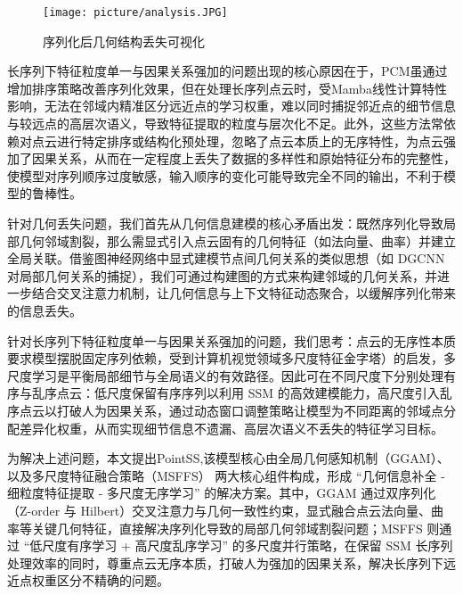\documentclass[preprint,12pt]{elsarticle}
\begin{document}
\begin{figure}[htbp]
	\centering
	\texttt{[image: picture/analysis.JPG]}
	\caption{序列化后几何结构丢失可视化}
	\label{fig:analysis}
\end{figure}

长序列下特征粒度单一与因果关系强加的问题出现的核心原因在于，PCM虽通过增加排序策略改善序列化效果，但在处理长序列点云时，受Mamba线性计算特性影响，无法在邻域内精准区分远近点的学习权重，难以同时捕捉邻近点的细节信息与较远点的高层次语义，导致特征提取的粒度与层次化不足。此外，这些方法常依赖对点云进行特定排序或结构化预处理，忽略了点云本质上的无序特性，为点云强加了因果关系，从而在一定程度上丢失了数据的多样性和原始特征分布的完整性，使模型对序列顺序过度敏感，输入顺序的变化可能导致完全不同的输出，不利于模型的鲁棒性。

针对几何丢失问题，我们首先从几何信息建模的核心矛盾出发：既然序列化导致局部几何邻域割裂，那么需显式引入点云固有的几何特征（如法向量、曲率）并建立全局关联。借鉴图神经网络中显式建模节点间几何关系的类似思想（如 DGCNN 对局部几何关系的捕捉\cite{DGCNN}），我们可通过构建图的方式来构建邻域的几何关系，并进一步结合交叉注意力机制，让几何信息与上下文特征动态聚合，以缓解序列化带来的信息丢失。

针对长序列下特征粒度单一与因果关系强加的问题，我们思考：点云的无序性本质要求模型摆脱固定序列依赖，受到计算机视觉领域多尺度特征金字塔\cite{fpn}）的启发，多尺度学习是平衡局部细节与全局语义的有效路径。因此可在不同尺度下分别处理有序与乱序点云：低尺度保留有序序列以利用 SSM 的高效建模能力，高尺度引入乱序点云以打破人为因果关系，通过动态窗口调整策略让模型为不同距离的邻域点分配差异化权重，从而实现细节信息不遗漏、高层次语义不丢失的特征学习目标。

为解决上述问题，本文提出PointSS,该模型核心由全局几何感知机制（GGAM）、以及多尺度特征融合策略（MSFFS） 两大核心组件构成，形成 “几何信息补全 - 细粒度特征提取 - 多尺度无序学习” 的解决方案。其中，GGAM 通过双序列化（Z-order 与 Hilbert）交叉注意力与几何一致性约束，显式融合点云法向量、曲率等关键几何特征，直接解决序列化导致的局部几何邻域割裂问题；MSFFS 则通过 “低尺度有序学习 + 高尺度乱序学习” 的多尺度并行策略，在保留 SSM 长序列处理效率的同时，尊重点云无序本质，打破人为强加的因果关系，解决长序列下远近点权重区分不精确的问题。
\end{document}

